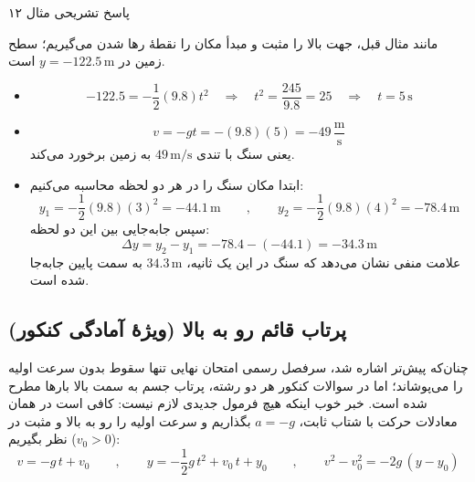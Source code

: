 \documentclass[12pt, a4paper]{article}
\begin{document}
\begin{answerbox}{پاسخ تشریحی مثال ۱۲}

مانند مثال قبل، جهت بالا را مثبت و مبدأ مکان را نقطهٔ رها شدن می‌گیریم؛ سطح زمین در $y = -122.5\,\text{m}$ است.

\begin{itemize}
    \item[الف)]
    \[
    -122.5 = -\frac{1}{2}(9.8)t^2 \quad \Longrightarrow \quad t^2 = \frac{245}{9.8} = 25 \quad \Longrightarrow \quad t = 5\,\text{s}
    \]

    \item[ب)]
    \[
    v = -gt = -(9.8)(5) = -49\,\frac{\text{m}}{\text{s}}
    \]
    یعنی سنگ با تندی $49\,\text{m/s}$ به زمین برخورد می‌کند.

    \item[پ)] ابتدا مکان سنگ را در هر دو لحظه محاسبه می‌کنیم:
    \[
    y_1 = -\frac{1}{2}(9.8)(3)^2 = -44.1\,\text{m}
    \qquad , \qquad
    y_2 = -\frac{1}{2}(9.8)(4)^2 = -78.4\,\text{m}
    \]
    سپس جابه‌جایی بین این دو لحظه:
    \[
    \Delta y = y_2 - y_1 = -78.4 - (-44.1) = -34.3\,\text{m}
    \]
    علامت منفی نشان می‌دهد که سنگ در این یک ثانیه، $34.3\,\text{m}$ به سمت پایین جابه‌جا شده است.
\end{itemize}
\end{answerbox}

\subsection{پرتاب قائم رو به بالا (ویژهٔ آمادگی کنکور)}
چنان‌که پیش‌تر اشاره شد، سرفصل رسمی امتحان نهایی تنها سقوط بدون سرعت اولیه را می‌پوشاند؛ اما در سوالات کنکور هر دو رشته، پرتاب جسم به سمت بالا بارها مطرح شده است. خبر خوب اینکه هیچ فرمول جدیدی لازم نیست: کافی است در همان معادلات حرکت با شتاب ثابت، $a = -g$ بگذاریم و سرعت اولیه را رو به بالا و مثبت در نظر بگیریم ($v_0 > 0$):
\[
v = -g\,t + v_0
\qquad , \qquad
y = -\frac{1}{2}g\,t^2 + v_0\,t + y_0
\qquad , \qquad
v^2 - v_0^2 = -2g\,(y - y_0)
\]
\end{document}
